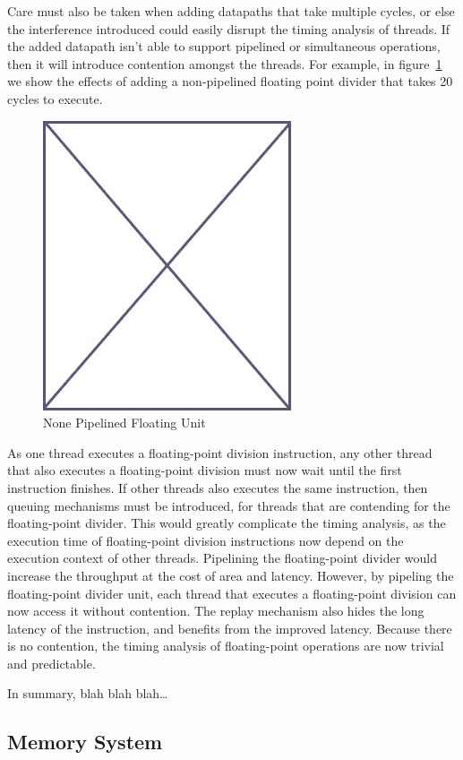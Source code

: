 Care must also be taken when adding datapaths that take multiple cycles, or else the interference introduced could easily disrupt the timing analysis of threads.
If the added datapath isn't able to support pipelined or simultaneous operations, then it will introduce contention amongst the threads.
For example, in figure~\ref{fig:none_pipelined_floatingpoint} we show the effects of adding a non-pipelined floating point divider that takes 20 cycles to execute.    
\begin{figure}
\begin{center}
\includegraphics[scale=.4]{figs/placeholder}
\end{center}
\caption{None Pipelined Floating Unit}
\label{fig:none_pipelined_floatingpoint}
\end{figure}
As one thread executes a floating-point division instruction, any other thread that also executes a floating-point division must now wait until the first instruction finishes. 
If other threads also executes the same instruction, then queuing mechanisms must be introduced, for threads that are contending for the floating-point divider. 
This would greatly complicate the timing analysis, as the execution time of floating-point division instructions now depend on the execution context of other threads.
Pipelining the floating-point divider would increase the throughput at the cost of area and latency. 
However, by pipeling the floating-point divider unit, each thread that executes a floating-point division can now access it without contention. 
The replay mechanism also hides the long latency of the instruction, and benefits from the improved latency. 
Because there is no contention, the timing analysis of floating-point operations are now trivial and predictable.     

In summary, blah blah blah\ldots
\subsection{Memory System}
\label{subsection:memory_system}


